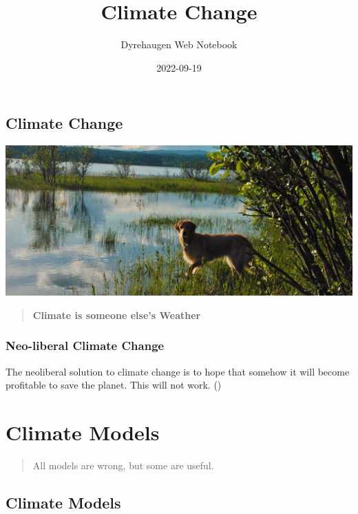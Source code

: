 \documentclass[
]{book}
\title{Climate Change}
\author{Dyrehaugen Web Notebook}
\date{2022-09-19}
\begin{document}
\maketitle

{
\setcounter{tocdepth}{1}
\tableofcontents
}
\hypertarget{climate-change}{%
\chapter{Climate Change}\label{climate-change}}

\includegraphics{fig/zelda.jpg}

\begin{quote}
\textbf{Climate is someone else's Weather}
\end{quote}

\hypertarget{neo-liberal-climate-change}{%
\section{Neo-liberal Climate Change}\label{neo-liberal-climate-change}}

The neoliberal solution to climate change is to hope
that somehow it will become profitable to save the planet.
This will not work.
(\citet{ExistentialComics})

\hypertarget{part-climate-models}{%
\part{Climate Models}\label{part-climate-models}}

\begin{quote}
All models are wrong, but some are useful.
\end{quote}

\hypertarget{climate-models}{%
\chapter{Climate Models}\label{climate-models}}
\end{document}
